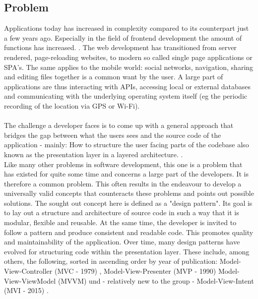 \subsection{Problem}
\label{subsec:problem}

Applications today has increased in complexity compared to its counterpart just a few years ago. Especially in the field of frontend development the amount of 
functions has increased.
\cite{kevin2018}. 
The web development has transitioned from server rendered, 
page-reloading websites, to modern so called single page applications or SPA's.
The same applies to the mobile world: social networks, navigation, sharing and editing files together is a common want by the user.
A large part of applications are thus interacting with APIs, accessing local or external databases
and communicating with the underlying operating system itself (eg the periodic recording of the location via GPS or Wi-Fi).
\\
\\
The challenge a developer faces is to come up with a general approach that bridges the gap between what the users sees and the source code of 
the application - mainly: How to structure the user facing parts of the codebase also known as the presentation layer in a layered architecture.
\cite{guru99ntier,softwareArchitecturePatternsMark2015}.
\\
Like many other problems in software development, this one is a problem that has existed for quite some time and concerns a large part of the developers.
It is therefore a common problem. This often results in the endeavour to develop a universally valid concepts that counteracts these problems and points out 
possible solutions. The sought out concept here is defined as a "design pattern".
\cite{techterms2016design-pattern}
Its goal is to lay out a structure and architecture of source code in such a way that it is modular, flexible and
reusable. At the same time, the developer is invited to follow a pattern and produce consistent and readable code. This promotes quality and
maintainability of the application. Over time, many design patterns have evolved for structuring code within the presentation layer. 
These include, among others, the following, sorted in ascending order by year of publication: Model-View-Controller (MVC - 1979) 
\cite{wikipediaMvc}, 
Model-View-Presenter (MVP - 1990) 
\cite{wikipediaMvp} 
Model-View-ViewModel (MVVM) 
\cite{blogMsdnMvvm} und - relatively
new to the group - Model-View-Intent (MVI - 2015) 
\cite{youtubeAndreStaltzUserFunction}. 
